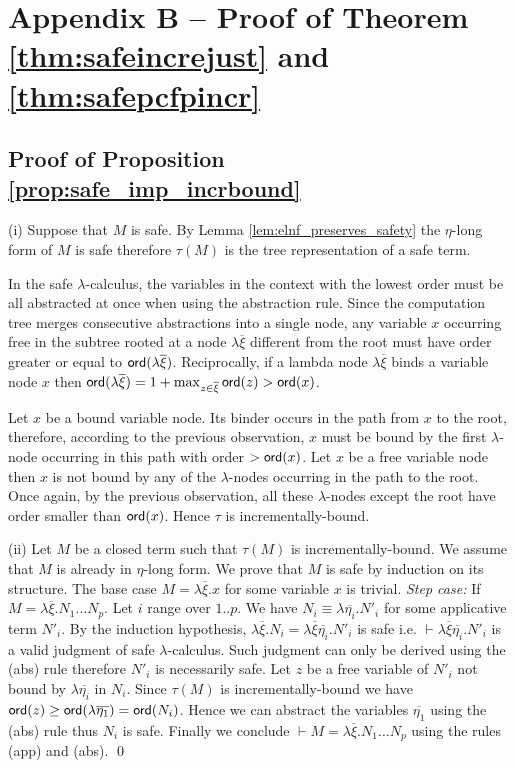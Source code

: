 \documentclass{llncs}
\begin{document}
\section*{Appendix B -- Proof of Theorem \ref{thm:safeincrejust} and \ref{thm:safepcfpincr}}

\subsection{Proof of Proposition \ref{prop:safe_imp_incrbound}}
  (i) Suppose that $M$ is safe. By Lemma
  \ref{lem:elnf_preserves_safety} the $\eta$-long form of $M$ is safe
  therefore $\tau(M)$ is the tree representation of a safe term.

In the safe $\lambda$-calculus, the variables in the context with the
lowest order must be all abstracted at once when using the abstraction
rule. Since the computation tree merges consecutive abstractions into
a single node, any variable $x$ occurring free in the subtree rooted
at a node $\lambda \overline{\xi}$ different from the root must have
order greater or equal to ${\sf ord}(\lambda
  \overline{\xi})$. Reciprocally, if a lambda node $\lambda
\overline{\xi}$ binds a variable node $x$ then ${\sf ord}(\lambda
  \overline{\xi}) = 1+\max_{z\in\overline{\xi}} {\sf ord}(z) > {\sf ord}(x)$.

Let $x$ be a bound variable node. Its binder occurs in the path from
$x$ to the root, therefore, according to the previous observation, $x$
must be bound by the first $\lambda$-node occurring in this path with
order $>{\sf ord}(x)$. Let $x$ be a free variable node then $x$ is not
bound by any of the $\lambda$-nodes occurring in the path to the
root. Once again, by the previous observation, all these
$\lambda$-nodes except the root have order smaller than
${\sf ord}(x)$. Hence $\tau$ is incrementally-bound.

(ii) Let $M$ be a closed term such that $\tau(M)$ is
incrementally-bound.  We assume that $M$ is already in $\eta$-long
form.  We prove that $M$ is safe by induction on its structure. The
base case $M = \lambda \overline{\xi} . x$ for some variable $x$ is
trivial.  \emph{Step case:} If $M = \lambda \overline{\xi} . N_1
\ldots N_p$.  Let $i$ range over $1..p$. We have $N_i \equiv \lambda
\overline{\eta_i} . N'_i$ for some applicative term $N'_i$. By the
induction hypothesis, $\lambda \overline{\xi} . N_i = \lambda
\overline{\xi} \overline{\eta_i} . N'_i$ is safe i.e. $\vdash \lambda
\overline{\xi} \overline{\eta_i} . N'_i$ is a valid judgment of safe
$\lambda$-calculus.  Such judgment can only be derived using the (abs)
rule therefore $N'_i$ is necessarily safe. Let $z$ be a free variable
of $N'_i$ not bound by $\lambda \overline{\eta_i}$ in $N_i$. Since
$\tau(M)$ is incrementally-bound we have ${\sf ord}(z) \geq {\sf ord}(\lambda
  \overline{\eta_1}) = {\sf ord}(N_i)$. Hence we can abstract the variables
$\overline{\eta_1}$ using the (abs) rule thus $N_i$ is safe.  Finally
we conclude $\vdash M = \lambda \overline{\xi} . N_1 \ldots N_p$ using
the rules (app) and (abs).  \qed
\end{document}
